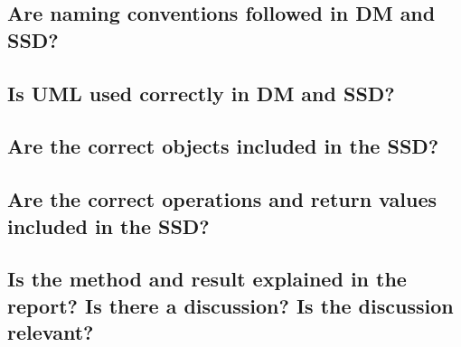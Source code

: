\documentclass[a4paper]{scrreprt}
\begin{document}
        \subsection{Are naming conventions followed in DM and SSD?}


        \subsection{Is UML used correctly in DM and SSD?}


        \subsection{Are the correct objects included in the SSD?}


        \subsection{Are the correct operations and return values included in the SSD?}


        \subsection{Is the method and result explained in the report? Is there a discussion? Is the discussion relevant?}

        
\end{document}

